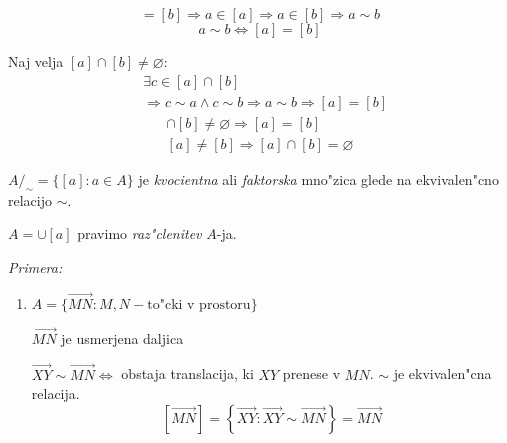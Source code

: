 \begin{equation*}
[a] = [b] \Rightarrow a \in [a] \Rightarrow a \in [b] \Rightarrow a \sim b
\end{equation*}
%
\begin{equation*}
a \sim b \iff [a] = [b]
\end{equation*}

Naj velja $[a] \cap [b] \neq \varnothing$:
\begin{align*}
&\exists c \in [a] \cap [b]\\
&\Rightarrow c \sim a \land c \sim b \Rightarrow a \sim b \Rightarrow [a] = [b]
\end{align*}
%
\begin{gather*}
	[a] \cap [b] \neq \varnothing \Rightarrow [a] = [b]\\
	[a] \neq [b] \Rightarrow [a] \cap [b] = \varnothing
\end{gather*}

$A/_\sim = \{[a]: a \in A\}$ je \emph{kvocientna} ali \emph{faktorska} mno"zica glede na ekvivalen"cno relacijo $\sim$.

$A = \cup [a]$ pravimo \emph{raz"clenitev} $A$-ja.

\emph{Primera:}
\begin{enumerate}[(1)]
	\item $A = \{\overrightarrow{MN}: M,N - \text{to"cki v prostoru} \}$
	
	$\overrightarrow{MN}$ je usmerjena daljica
	
	$\overrightarrow{XY} \sim \overrightarrow{MN} \iff$ obstaja translacija, ki $XY$ prenese v $MN$. $\sim$ je ekvivalen"cna relacija.
	\begin{equation*}
	\left[\overrightarrow{MN}\right] = \left\{\overrightarrow{XY}: \overrightarrow{XY} \sim \overrightarrow{MN}\right\} = \vec{MN}
	\end{equation*}
\end{enumerate}
